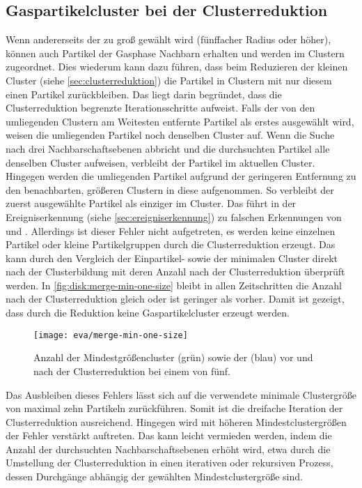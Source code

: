 \subsection*{Gaspartikelcluster bei der Clusterreduktion}  %

Wenn andererseits der  zu groß gewählt wird (fünffacher Radius oder höher), können auch Partikel der Gasphase Nachbarn erhalten und werden im \CFD Clustern zugeordnet. Dies wiederum kann dazu führen, dass beim Reduzieren der kleinen Cluster (siehe \autoref{sec:clusterreduktion}) die Partikel in Clustern mit nur diesem einen Partikel zurückbleiben. Das liegt darin begründet, dass die Clusterreduktion begrenzte Iterationsschritte aufweist. Falls der von den umliegenden Clustern am Weitesten entfernte Partikel als erstes ausgewählt wird, weisen die umliegenden Partikel noch denselben Cluster auf. Wenn die Suche nach drei Nachbarschaftsebenen abbricht und die durchsuchten Partikel alle denselben Cluster aufweisen, verbleibt der Partikel im aktuellen Cluster. Hingegen werden die umliegenden Partikel aufgrund der geringeren Entfernung zu den benachbarten, größeren Clustern in diese aufgenommen. So verbleibt der zuerst ausgewählte Partikel als einziger im Cluster. Das führt in der Ereigniserkennung (siehe \autoref{sec:ereigniserkennung}) zu falschen Erkennungen von  und .
Allerdings ist dieser Fehler nicht aufgetreten, es werden keine einzelnen Partikel oder kleine Partikelgruppen durch die Clusterreduktion erzeugt. Das kann durch den Vergleich der Einpartikel- sowie der minimalen Cluster direkt nach der Clusterbildung mit deren Anzahl nach der Clusterreduktion überprüft werden. In \autoref{fig:disk:merge-min-one-size} bleibt in allen Zeitschritten die Anzahl nach der Clusterreduktion gleich oder ist geringer als vorher. Damit ist gezeigt, dass durch die Reduktion keine Gaspartikelcluster erzeugt werden.

\begin{figure}
	\texttt{[image: eva/merge-min-one-size]}
	\caption{Anzahl der Mindestgrößencluster (grün) sowie der  (blau) vor und nach der Clusterreduktion bei einem  von fünf.}\label{fig:disk:merge-min-one-size}
\end{figure}

Das Ausbleiben dieses Fehlers lässt sich auf die verwendete minimale Clustergröße von maximal zehn Partikeln zurückführen. Somit ist die dreifache Iteration der Clusterreduktion ausreichend. Hingegen wird mit höheren Mindestclustergrößen der Fehler verstärkt auftreten. Das kann leicht vermieden werden, indem die Anzahl der durchsuchten Nachbarschaftsebenen erhöht wird, etwa durch die Umstellung der Clusterreduktion in einen iterativen oder rekursiven Prozess, dessen Durchgänge abhängig der gewählten Mindestclustergröße sind.

